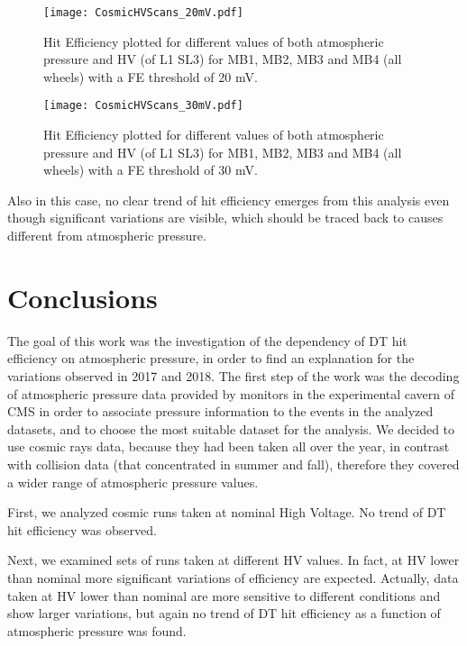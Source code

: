 \documentclass[12pt,twoside,a4paper]{report}
\numberwithin{equation}{section}
\begin{document}
\begin{figure}[!htb]
\begin{center}
\texttt{[image: CosmicHVScans\_20mV.pdf]}
\caption{\label{fig:Cosmics_HV_20} Hit Efficiency plotted for different values of both atmospheric pressure and HV (of L1 SL3) for MB1, MB2, MB3 and MB4 (all wheels) with a FE threshold of 20 mV. }
\end{center}
\end{figure}

\begin{figure}[!htb]
\begin{center}
\texttt{[image: CosmicHVScans\_30mV.pdf]}
\caption{\label{fig:Cosmics_HV_30} Hit Efficiency plotted for different values of both atmospheric pressure and HV (of L1 SL3) for MB1, MB2, MB3 and MB4 (all wheels) with a FE threshold of 30 mV.}
\end{center}
\end{figure}

Also in this case, no clear trend of hit efficiency emerges from this analysis even though significant variations are visible, which should be traced back to causes different from atmospheric pressure.

\chapter*{Conclusions}
The goal of this work was the investigation of the dependency of DT hit efficiency on atmospheric pressure, in order to find an explanation for the variations observed in 2017 and 2018.
The first step of the work was the decoding of atmospheric pressure data provided by monitors in the experimental cavern of CMS in order to associate pressure information to the events in the analyzed datasets, and to choose the most suitable dataset for the analysis.
We decided to use cosmic rays data, because they had been taken all over the year, in contrast with collision data (that concentrated in summer and fall), therefore they covered a wider range of atmospheric pressure values.

First, we analyzed cosmic runs taken at nominal High Voltage.
No trend of DT hit efficiency was observed.

Next, we examined sets of runs taken at different HV values. In fact, at HV lower than nominal more significant variations of efficiency are expected.
Actually, data taken at HV lower than nominal are more sensitive to different conditions and show larger variations, but again no trend of DT hit efficiency as a function of atmospheric pressure was found. 
\end{document}
